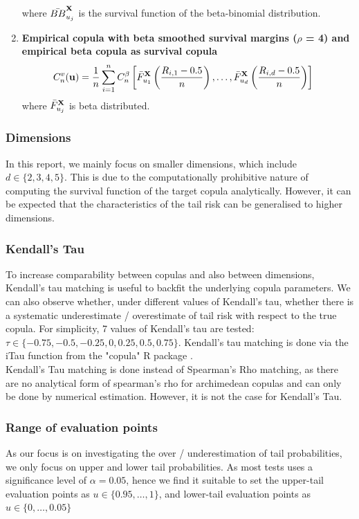 \documentclass[12pt]{report}
\newcommand{\1}{\mathbf{1}}
\begin{document}
\begin{flushleft}
\begin{enumerate}
\begin{align*}
\end{align*}
where $\Bar{BB}_{u_{j}}^{\textbf{X}}$ is the survival function of the beta-binomial distribution.
\item \textbf{Empirical copula with beta smoothed survival margins ($\rho$ = 4) and empirical beta copula as survival copula}
\begin{align*}
C_{n}^{v}(\textbf{u}) &= \frac{1}{n} \sum\limits_{i = 1}^{n} C_{n}^{\beta} \left[\Bar{F}_{u_{1}}^{\textbf{X}}\left(\frac{R_{i,1} - 0.5}{n}\right), \dots, \Bar{F}_{u_{d}}^{\textbf{X}}\left(\frac{R_{i,d} - 0.5}{n}\right) \right]
\end{align*}
where $\Bar{F}_{u_{j}}^{\textbf{X}}$ is beta distributed.
\end{enumerate}

\subsubsection{Dimensions}

In this report, we mainly focus on smaller dimensions, which include $d \in \{ 2, 3, 4, 5 \}$. This is due to the computationally prohibitive nature of computing the survival function of the target copula analytically. However, it can be expected that the characteristics of the tail risk can be generalised to higher dimensions.

\subsubsection{Kendall's Tau}
To increase comparability between copulas and also between dimensions, Kendall's tau matching is useful to backfit the underlying copula parameters. We can also observe whether, under different values of Kendall's tau, whether there is a systematic underestimate / overestimate of tail risk with respect to the true copula. For simplicity, 7 values of Kendall's tau are tested: $\tau \in \{ -0.75, -0.5, -0.25, 0, 0.25, 0.5, 0.75 \}$. Kendall's tau matching is done via the iTau function from the "copula" R package \parencite{copulaRPackage2023}. \\
\vspace{0.5cm}
Kendall's Tau matching is done instead of Spearman's Rho matching, as there are no analytical form of spearman's rho for archimedean copulas and can only be done by numerical estimation. However, it is not the case for Kendall's Tau.

\subsubsection{Range of evaluation points}
As our focus is on investigating the over / underestimation of tail probabilities, we only focus on upper and lower tail probabilities. As most tests uses a significance level of $\alpha = 0.05$, hence we find it suitable to set the upper-tail evaluation points as $u \in \{ 0.95, \dots, 1 \}$, and lower-tail evaluation points as $u \in \{ 0, \dots, 0.05 \}$


\end{flushleft}
\end{document}
